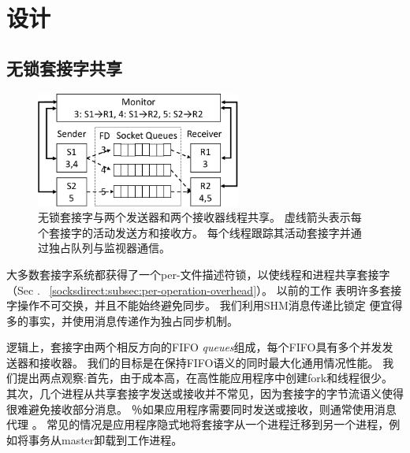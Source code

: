 
\section{设计}
\label{socksdirect:sec:design}


\subsection{无锁套接字共享}
\label{socksdirect:subsec:fork}


\begin{figure}[htbp]
	\centering
	\includegraphics[width=0.6\textwidth]{images/queue_arch}
	
	\caption{无锁套接字与两个发送器和两个接收器线程共享。 虚线箭头表示每个套接字的活动发送方和接收方。 每个线程跟踪其活动套接字并通过独占队列与监视器通信。}
	\label{socksdirect:fig:queue-arch}
\end{figure}

大多数套接字系统都获得了一个per-文件描述符锁，以使线程和进程共享套接字（Sec .~ \ref {socksdirect:subsec:per-operation-overhead}）。
以前的工作 \cite {boyd2010analysis,clements2015scalable}表明许多套接字操作不可交换，并且不能始终避免同步。
我们利用SHM消息传递比锁定 \cite {roghanchi2017ffwd}便宜得多的事实，并使用消息传递作为独占同步机制。

逻辑上，套接字由两个相反方向的FIFO \emph {queues}组成，每个FIFO具有多个并发发送器和接收器。
我们的目标是在保持FIFO语义的同时最大化通用情况性能。
我们提出两点观察:首先，由于成本高，在高性能应用程序中创建fork和线程很少。
其次，几个进程从共享套接字发送或接收并不常见，因为套接字的字节流语义使得很难避免接收部分消息。
％如果应用程序需要同时发送或接收，则通常使用消息代理 \cite {hintjens2013zeromq,rabbitmq2017rabbitmq,kreps2011kafka}。
常见的情况是应用程序隐式地将套接字从一个进程迁移到另一个进程，例如将事务从master卸载到工作进程。

